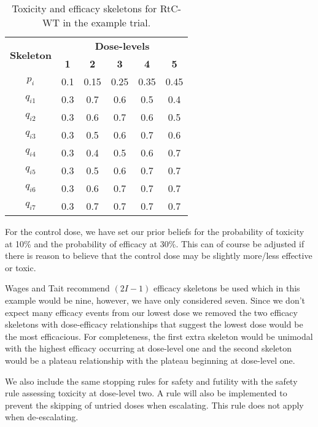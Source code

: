 \begin{table}[!h]
	\centering
	\caption{Toxicity and efficacy skeletons for RtC-WT in the example trial.}
	\label{tab_wt:tox-eff-skeleton}
	\begin{tabular}{c|ccccc}
		\hline
		\multicolumn{1}{c|}{\multirow{2}{*}{\textbf{Skeleton}}} & \multicolumn{5}{c}{\textbf{Dose-levels}}                       \\
		\multicolumn{1}{c|}{}                                   & \textbf{1} & \textbf{2} & \textbf{3} & \textbf{4} & \textbf{5} \\ \hline
		$p_i$    & 0.1 & 0.15 & 0.25 & 0.35 & 0.45 \\
		$q_{i1}$ & 0.3 & 0.7 & 0.6 & 0.5 & 0.4 \\
		$q_{i2}$ & 0.3 & 0.6 & 0.7 & 0.6 & 0.5 \\
		$q_{i3}$ & 0.3 & 0.5 & 0.6 & 0.7 & 0.6 \\
		$q_{i4}$ & 0.3 & 0.4 & 0.5 & 0.6 & 0.7 \\
		$q_{i5}$ & 0.3 & 0.5 & 0.6 & 0.7 & 0.7 \\
		$q_{i6}$ & 0.3 & 0.6 & 0.7 & 0.7 & 0.7 \\
		$q_{i7}$ & 0.3 & 0.7 & 0.7 & 0.7 & 0.7 \\ \hline
	\end{tabular}
\end{table}

For the control dose, we have set our prior beliefs for the probability of toxicity at 10\% and the probability of efficacy at 30\%. This can of course be adjusted if there is reason to believe that the control dose may be slightly more/less effective or toxic. 

Wages and Tait recommend $(2I-1)$ efficacy skeletons be used which in this example would be nine, however, we have only considered seven. Since we don't expect many efficacy events from our lowest dose we removed the two efficacy skeletons with dose-efficacy relationships that suggest the lowest dose would be the most efficacious. For completeness, the first extra skeleton would be unimodal with the highest efficacy occurring at dose-level one and the second skeleton would be a plateau relationship with the plateau beginning at dose-level one. 

We also include the same stopping rules for safety and futility with the safety rule assessing toxicity at dose-level two. A rule will also be implemented to prevent the skipping of untried doses when escalating. This rule does not apply when de-escalating. 

